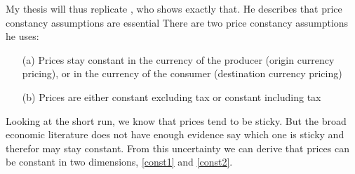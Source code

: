 



My thesis will thus replicate \cite{buiter2017exchange}, who shows exactly that. He describes that price constancy assumptions are essential  There are two price constancy assumptions he uses: 

\begin{itemize}
\item[(a)] \label{const1} Prices stay constant in the currency of the producer (origin currency pricing), or in the currency of the consumer (destination currency pricing)
\item[(b)] \label{const2} Prices are either constant excluding tax or constant including tax 
\end{itemize}

Looking at the short run, we know that prices tend to be sticky. But the broad economic literature does not have enough evidence say which one is sticky and therefor may stay constant. From this uncertainty we can derive that prices can be constant in two dimensions, \ref{const1} and \ref{const2}.

